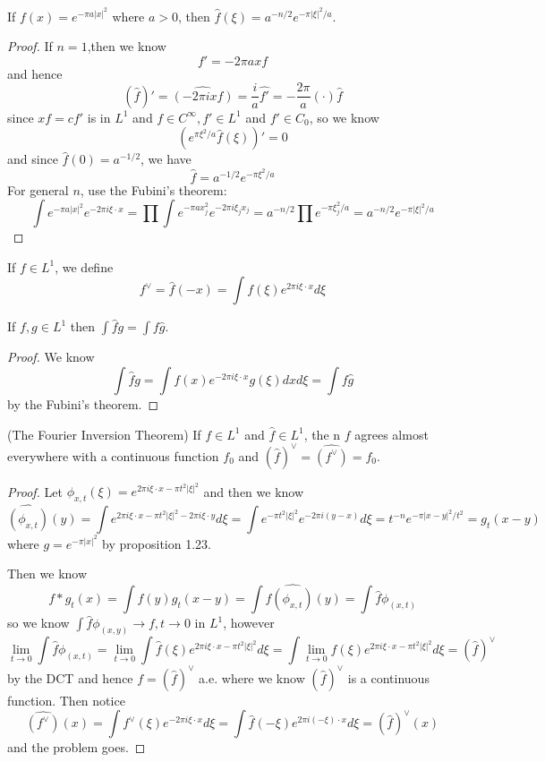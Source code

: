 \documentclass[lang=en, color=blue, ]{elegantbook}
\begin{document}
\begin{proposition}
    If $f(x) = e^{-\pi a |x|^2}$ where $a>0$, then $\hat{f}(\xi) = a^{-n/2}e^{-\pi|\xi|^2/a}$.
\end{proposition}
\begin{proof}\par
    If $n=1$,then we know
    \[f' = -2\pi axf\]
    and hence
    \[
    (\hat{f})' = \hat{(-2\pi i x f)} = \dfrac{i}{a}\hat{f'} = -\dfrac{2\pi}{a} (\cdot)\hat{f}
    \]
    since $xf = cf'$ is in $L^1$ and $f\in C^{\infty}, f'\in L^1$ and $f'\in C_0$, so we know
    \[(e^{\pi\xi^2/a}\hat{f}(\xi))' = 0\]
    and since $\hat{f}(0) = a^{-1/2}$, we have
    \[
    \hat{f} = a^{-1/2}e^{-\pi\xi^2/a}
    \]
    For general $n$, use the Fubini's theorem:
    \[
    \int e^{-\pi a|x|^2}e^{-2\pi i \xi\cdot x} = \prod\int e^{-\pi ax_j^2}e^{-2\pi i \xi_jx_j} = a^{-n/2}\prod e^{-\pi \xi_j^2/a} = a^{-n/2} e^{-\pi|\xi|^2/a}
    \]
\end{proof}

\begin{definition}
    If $f\in L^1$, we define
    \[f^{\vee} = \hat{f}(-x) = \int f(\xi)e^{2\pi i \xi\cdot x} d\xi\]
\end{definition}

\begin{lemma}
    If $f,g\in L^1$ then $\int\hat{f}g = \int f\hat{g}$.
\end{lemma}
\begin{proof}\par
    We know
    \[
    \int\hat{f}g = \int f(x)e^{-2\pi i \xi\cdot x} g(\xi) dx d\xi = \int f\hat{g}
    \]
    by the Fubini's theorem.
\end{proof}

\begin{theorem}
    (The Fourier Inversion Theorem) If $f\in L^1$ and $\hat{f}\in L^1$, the n $f$ agrees almost everywhere with a continuous function $f_0$ and $(\hat{f})^{\vee} = \hat{(f^{\vee})} = f_0$.
\end{theorem}
\begin{proof}\par
    Let $\phi_{x,t}(\xi) = e^{2\pi i \xi\cdot x - \pi t^2|\xi|^2}$ and then we know
    \[
    \hat{(\phi_{x,t})}(y) = \int e^{2\pi i \xi\cdot x- \pi t^2|\xi|^2-2\pi i \xi\cdot y}d\xi = \int e^{-\pi t^2|\xi|^2}e^{-2\pi i (y-x)}d\xi = t^{-n}e^{-\pi |x-y|^2/t^2} = g_t(x-y)
    \]
    where $g = e^{-\pi|x|^2}$ by proposition 1.23.\par
    Then we know
    \[
    f*g_t(x) = \int f(y)g_t(x-y) = \int f\hat{(\phi_{x,t})}(y) = \int \hat{f}\phi_{(x,t)}
    \]
    so we know $\int\hat{f}\phi_{(x,y)} \to f,t\to 0$ in $L^1$, however
    \[
    \lim_{t\to 0}\int\hat{f}\phi_{(x,t)} = \lim_{t\to 0}\int\hat{f}(\xi)e^{2\pi i \xi\cdot x - \pi t^2|\xi|^2}d\xi = \int \lim_{t\to 0}\hat{f}(\xi)e^{2\pi i \xi\cdot x - \pi t^2|\xi|^2}d\xi = (\hat{f})^{\vee}
    \]
    by the DCT and hence $f = (\hat{f})^{\vee}$ a.e. where we know $(\hat{f})^{\vee}$ is a continuous function. Then notice
    \[
    \hat{(f^{\vee})}(x) = \int f^{\vee}(\xi)e^{-2\pi i \xi\cdot x}d\xi = \int \hat{f}(-\xi)e^{2\pi i (-\xi)\cdot x} d\xi = (\hat{f})^{\vee}(x)
    \]
    and the problem goes.
\end{proof}
\end{document}
